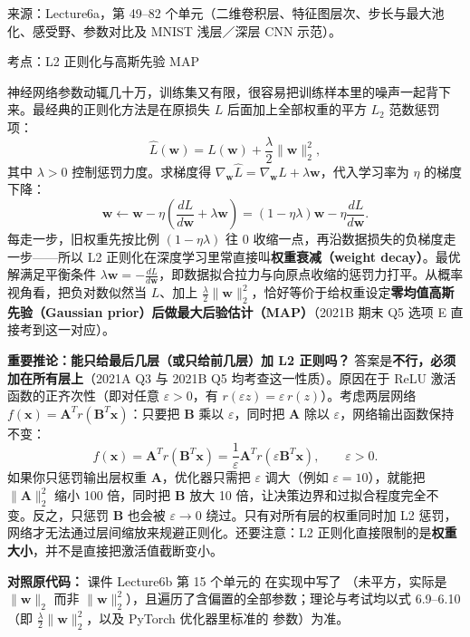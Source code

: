 来源：Lecture6a，第 49–82 个单元（二维卷积层、特征图层次、步长与最大池化、感受野、参数对比及 MNIST 浅层／深层 CNN 示范）。



考点：L2 正则化与高斯先验 MAP 

神经网络参数动辄几十万，训练集又有限，很容易把训练样本里的噪声一起背下来。最经典的正则化方法是在原损失 $L$ 后面加上全部权重的平方 $L_2$ 范数惩罚项：
\[
\hat{L}(\mathbf{w}) = L(\mathbf{w}) + \frac{\lambda}{2}\|\mathbf{w}\|_2^2,
\tag{6.9}
\]
其中 $\lambda > 0$ 控制惩罚力度。求梯度得 $\nabla_{\mathbf{w}}\hat{L} = \nabla_{\mathbf{w}}L + \lambda\mathbf{w}$，代入学习率为 $\eta$ 的梯度下降：
\[
\mathbf{w} \leftarrow \mathbf{w} - \eta\left(\frac{dL}{d\mathbf{w}} + \lambda\mathbf{w}\right)
= (1 - \eta\lambda)\mathbf{w} - \eta\frac{dL}{d\mathbf{w}}.
\tag{6.10}
\]
每走一步，旧权重先按比例 $(1-\eta\lambda)$ 往 0 收缩一点，再沿数据损失的负梯度走一步——所以 L2 正则化在深度学习里常直接叫\textbf{权重衰减（weight decay）}。最优解满足平衡条件 $\lambda\mathbf{w} = -\frac{dL}{d\mathbf{w}}$，即数据拟合拉力与向原点收缩的惩罚力打平。从概率视角看，把负对数似然当 $L$、加上 $\frac{\lambda}{2}\|\mathbf{w}\|_2^2$，恰好等价于给权重设定\textbf{零均值高斯先验（Gaussian prior）后做最大后验估计（MAP）}（2021B 期末 Q5 选项 E 直接考到这一对应）。

\textbf{重要推论：能只给最后几层（或只给前几层）加 L2 正则吗？} 答案是\textbf{不行，必须加在所有层上}（2021A Q3 与 2021B Q5 均考查这一性质）。原因在于 ReLU 激活函数的正齐次性（即对任意 $\varepsilon > 0$，有 $r(\varepsilon z) = \varepsilon\,r(z)$）。考虑两层网络 $f(\mathbf{x}) = \mathbf{A}^T r(\mathbf{B}^T\mathbf{x})$：只要把 $\mathbf{B}$ 乘以 $\varepsilon$，同时把 $\mathbf{A}$ 除以 $\varepsilon$，网络输出函数保持不变：
\[
f(\mathbf{x}) = \mathbf{A}^T r(\mathbf{B}^T\mathbf{x}) = \frac{1}{\varepsilon}\mathbf{A}^T r(\varepsilon\mathbf{B}^T\mathbf{x}),\qquad \varepsilon > 0.
\tag{6.11}
\]
如果你只惩罚输出层权重 $\mathbf{A}$，优化器只需把 $\varepsilon$ 调大（例如 $\varepsilon=10$），就能把 $\|\mathbf{A}\|_2^2$ 缩小 100 倍，同时把 $\mathbf{B}$ 放大 10 倍，让决策边界和过拟合程度完全不变。反之，只惩罚 $\mathbf{B}$ 也会被 $\varepsilon \to 0$ 绕过。只有对所有层的权重同时加 L2 惩罚，网络才无法通过层间缩放来规避正则化。还要注意：L2 正则化直接限制的是\textbf{权重大小}，并不是直接把激活值截断变小。

\textbf{对照原代码：} 课件 Lecture6b 第 15 个单元的  在实现中写了 （未平方，实际是 $\|\mathbf{w}\|_2$ 而非 $\|\mathbf{w}\|_2^2$），且遍历了含偏置的全部参数；理论与考试均以式 6.9–6.10（即 $\frac{\lambda}{2}\|\mathbf{w}\|_2^2$，以及 PyTorch 优化器里标准的  参数）为准。

